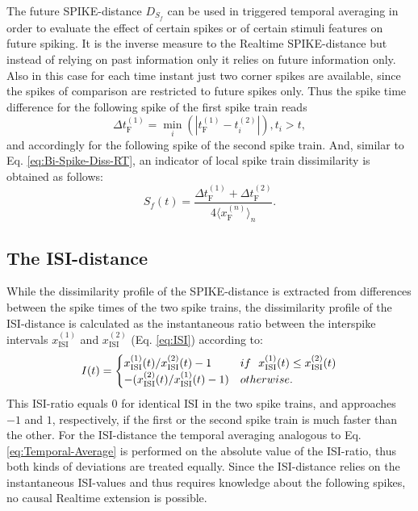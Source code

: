 \documentclass[10pt,twocolumn]{elsart5p}
\begin{document}
The future SPIKE-distance $D_{S_f}$ can be used in triggered temporal averaging in order to evaluate the effect of certain spikes or of certain stimuli features on future spiking. It is the inverse measure to the Realtime SPIKE-distance but instead of relying on past information only it relies on future information only. Also in this case for each time instant just two corner spikes are available, since the spikes of comparison are restricted to future spikes only. Thus the spike time difference for the following spike of the first spike train reads
%
\begin{equation} \label{eq:Delta-Corner-Spike-Future}
     \Delta t_{\mathrm {F}}^{(1)} = \min_i (| t_{\mathrm {F}}^{(1)} - t_i^{(2)} |), t_i > t,
\end{equation}
%
and accordingly for the following spike of the second spike train. And, similar to Eq. \ref{eq:Bi-Spike-Diss-RT}, an indicator of local spike train dissimilarity is obtained as follows:
%
\begin{equation} \label{eq:Bi-Spike-Diss-FT}
    S_f (t) = \frac{ \Delta t_{\mathrm {F}}^{(1)} + \Delta t_{\mathrm {F}}^{(2)}} {4 \langle x_{\mathrm {F}}^{(n)} \rangle_n}.
\end{equation}




\subsection{\label{ss:ISI-Distance} The ISI-distance}

While the dissimilarity profile of the SPIKE-distance is extracted from differences between the spike times of the two spike trains, the dissimilarity profile of the ISI-distance \citep{Kreuz07c, Kreuz09} is calculated as the instantaneous ratio between the interspike intervals $x_{\mathrm {ISI}}^{(1)}$ and $x_{\mathrm {ISI}}^{(2)}$ (Eq. \ref{eq:ISI}) according to:
%
\begin{equation} \label{eq:ISI-Ratio}
    I (t) = \begin{cases}
           x_{\mathrm {ISI}}^{(1)} (t) / x_{\mathrm {ISI}}^{(2)} (t) - 1 & {\rm if} ~~ x_{\mathrm {ISI}}^{(1)} (t) \leq x_{\mathrm {ISI}}^{(2)} (t) \cr
                      - (x_{\mathrm {ISI}}^{(2)} (t) / x_{\mathrm {ISI}}^{(1)} (t) -1)     & {\rm otherwise}.
                  \end{cases}
\end{equation}
%
This ISI-ratio equals $0$ for identical ISI in the two spike trains, and approaches $-1$ and $1$, respectively, if the first or the second spike train is much faster than the other. For the ISI-distance the temporal averaging analogous to Eq. \ref{eq:Temporal-Average} 
is performed on the absolute value of the ISI-ratio, thus both kinds of deviations are treated equally. Since the ISI-distance relies on the instantaneous ISI-values and thus requires knowledge about the following spikes, no causal Realtime extension is possible.
\end{document}
